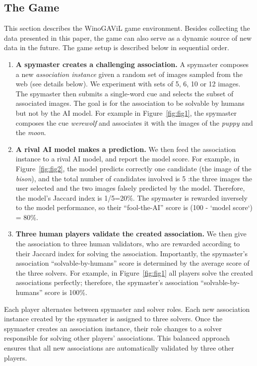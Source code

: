 \documentclass{article}
\newcommand{\ouracronym}[0]{WinoGAViL}
\newcommand{\associationinstance}[0]{\emph{association instance}}
\begin{document}
\subsection{The Game}
\label{sec:gvlab_game}
This section describes the \ouracronym{} game environment. Besides collecting the data presented in this paper, the game can also serve as a dynamic source of new data in the future. The game setup is described below in sequential order.


\begin{enumerate}
    \item \textbf{A spymaster creates a challenging association.} A spymaster composes a new \associationinstance{} given a random set of images sampled from the web (see details below). We experiment with sets of 5, 6, 10 or 12 images. The spymaster then submits a single-word cue and selects the subset of associated images. The goal is for the association to be solvable by humans but not by the AI model. For example in Figure~\ref{fig:fig1}, the spymaster composes the cue \emph{werewolf} and associates it with the images of the \emph{puppy} and the \emph{moon}.
    \item \textbf{A rival AI model makes a prediction.}
    We then feed the association instance to a rival AI model, and report the model score. For example, in Figure~\ref{fig:fig2}, the model predicts correctly one candidate (the image of the \textit{bison}), and the total number of candidates involved is 5 :the three images the user selected and the two images falsely predicted by the model. Therefore, the model's Jaccard index is 1/5=20\%. The spymaster is rewarded inversely to the model performance, so their ``fool-the-AI'' score is (100 - `model score`) = 80\%. 

    \item \textbf{Three human players validate the created association.}
    We then give the association to three human validators, who are rewarded according to their Jaccard index for solving the association. Importantly, the spymaster's association ``solvable-by-humans'' score is determined by the average score of the three solvers. For example, in Figure~\ref{fig:fig1} all players solve the created associations perfectly; therefore, the spymaster's association ``solvable-by-humans'' score is 100\%. 
\end{enumerate}

Each player alternates between spymaster and solver roles. Each new association instance created by the spymaster is assigned to three solvers. Once the spymaster creates an association instance, their role changes to a solver responsible for solving other players' associations. This balanced approach ensures that all new associations are automatically validated by three other players. 
\end{document}
